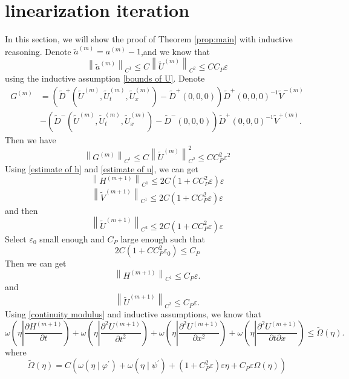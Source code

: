 \documentclass[a4paper,reqno,11pt]{amsart}
\numberwithin{equation}{section} %
\begin{document}
\section{linearization iteration}
In this section, we will show the proof of Theorem \ref{prop:main} with inductive reasoning. Denote $\tilde{a}^{(m)}=a^{(m)}-1$,and we know that
$$
\left\| \tilde{a}^{(m)} \right\| _{C^1}\leqslant C\left\| \tilde{U}^{(m)} \right\| _{C^2}\leqslant CC_P\varepsilon 
$$
using the inductive assumption \eqref{bounds of U}.
Denote
$$
\begin{aligned}
	G^{(m)} &=\left(\widetilde{D}^{+}\left(\widetilde{U}^{(m)}, \widetilde{U}_t^{(m)}, \widetilde{U}_x^{(m)}\right)-\widetilde{D}^{+}(0,0,0)\right) \widetilde{D}^{+}(0,0,0)^{-1} \widetilde{V}^{-(m)} \\
		& -\left(\widetilde{D}^{-}\left(\widetilde{U}^{(m)}, \widetilde{U}_t^{(m)}, \widetilde{U}_x^{(m)}\right)-\widetilde{D}^{-}(0,0,0)\right) \widetilde{D}^{+}(0,0,0)^{-1} \widetilde{V}^{+(m)}.
\end{aligned}
$$
Then we have
$$
\left\| G^{(m)} \right\| _{C^1}\leqslant C\left\| \tilde{U}^{(m)} \right\| _{C^2}^{2}\leqslant CC_{P}^{2}\varepsilon ^2
$$
Using \eqref{estimate of h} and \eqref{estimate of u}, we can get
$$
\left\| H^{(m+1)} \right\| _{C^1}\leqslant 2C\left( 1+CC_{P}^{2}\varepsilon \right) \varepsilon 
$$
$$
\left\| \tilde{V}^{(m+1)} \right\| _{C^1} \leqslant 2C\left( 1+CC_{P}^{2}\varepsilon \right) \varepsilon 
$$
and then
$$
\left\| \tilde{U}^{(m+1)} \right\| _{C^2} \leqslant 2C\left( 1+CC_{P}^{2}\varepsilon \right) \varepsilon 
$$
Select $\varepsilon _0$ small enough and $C_P$ large enough such that
$$
2C\left( 1+CC_{P}^{2}\varepsilon _0 \right) \leqslant C_P
$$
Then we can get
$$
\left\| H^{(m+1)} \right\| _{C^1}\leqslant C_P\varepsilon.
$$
and
$$
\left\| \tilde{U}^{(m+1)} \right\| _{C^2}\leqslant C_P\varepsilon.
$$
Using \eqref{continuity modulus} and inductive assumptions, we know that
\begin{equation}
\omega \left( \eta \left| \frac{\partial H^{\left( m +1\right)}}{\partial t} \right. \right) +\omega \left(  \eta \left|\frac{\partial ^2U^{\left( m +1\right)}}{\partial t^2} \right. \right) +\omega \left( \eta \left|\frac{\partial ^2U^{\left( m +1\right)}}{\partial x^2} \right.  \right) +\omega \left( \eta \left|\frac{\partial ^2U^{\left( m+1 \right)}}{\partial t\partial x} \right. \right) \leq \tilde{\Omega} \left( \eta \right) .
\end{equation}
where
$$
\widetilde{\Omega }(\eta )=C\left( \omega \left( \eta \mid \varphi ^{\prime} \right) +\omega \left( \eta \mid \psi ^{\prime} \right) +\left( 1+C_{P}^{2}\varepsilon \right) \varepsilon \eta +C_P\varepsilon \Omega (\eta ) \right) 
$$
\end{document}
